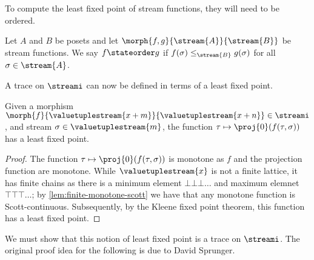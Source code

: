 \lemma

To compute the least fixed point of stream functions, they will need to be
ordered.

\begin{definition}\label{def:state-order}
    Let \(A\) and \(B\) be posets and let
    \(\morph{f, g}{\stream{A}}{\stream{B}}\) be stream functions.
    We say \(f \stateorder g\) if \(f(\sigma) \leq_{\stream{B}} g(\sigma)\)
    for all \(\sigma \in \stream{A}\).
\end{definition}

A trace on \(\streami\) can now be defined in terms of a least fixed
point.

\begin{lemma}\label{lem:lfp-stream-function}
    Given a morphism \(
    \morph{f}{\valuetuplestream{x+m}}{\valuetuplestream{x+n}}
    \in \streami
    \), and stream \(\sigma \in \valuetuplestream{m}\), the function \(
    \tau \mapsto \proj{0}\mleft(f(\tau,\sigma)\mright)
    \) has a least fixed point.
\end{lemma}
\begin{proof}
    The function \(\tau \mapsto \proj{0}\mleft(f(\tau,\sigma)\mright)\) is
    monotone as \(f\) and the projection function are monotone.
    While \(\valuetuplestream{x}\) is not a finite lattice, it has finite
    chains as there is a minimum element \(\bot\bot\bot\dots\) and maximum
    elemnet \(\top\top\top\dots\); by \cref{lem:finite-monotone-scott} we have
    that any monotone function is Scott-continuous.
    Subsequently, by the Kleene fixed point theorem, this function has a least
    fixed point.
\end{proof}

We must show that this notion of least fixed point is a trace on \(\streami\).
The original proof idea for the following is due to David Sprunger.

